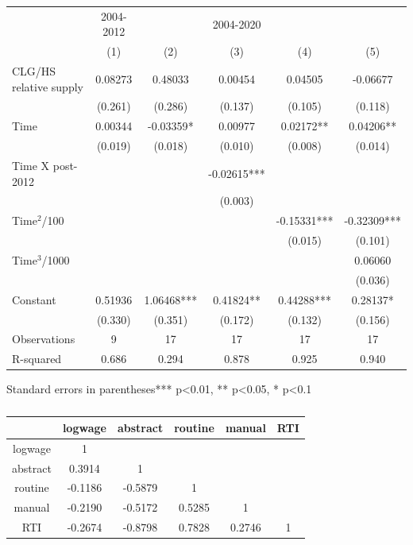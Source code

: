 \begin{center}
\begin{table}
\begin{centering}
\begin{tabular}{lccccc}
\toprule 
 & 2004-2012 &  & 2004-2020 &  & \tabularnewline
 & (1) & (2) & (3) & (4) & (5)\tabularnewline
\midrule
CLG/HS relative supply & 0.08273 & 0.48033 & 0.00454 & 0.04505 & -0.06677\tabularnewline
 & (0.261) & (0.286) & (0.137) & (0.105) & (0.118)\tabularnewline
Time & 0.00344 & -0.03359{*} & 0.00977 & 0.02172{*}{*} & 0.04206{*}{*}\tabularnewline
 & (0.019) & (0.018) & (0.010) & (0.008) & (0.014)\tabularnewline
Time X post-2012 &  &  & -0.02615{*}{*}{*} &  & \tabularnewline
 &  &  & (0.003) &  & \tabularnewline
Time$^{2}$/100 &  &  &  & -0.15331{*}{*}{*} & -0.32309{*}{*}{*}\tabularnewline
 &  &  &  & (0.015) & (0.101)\tabularnewline
Time$^{3}$/1000 &  &  &  &  & 0.06060\tabularnewline
 &  &  &  &  & (0.036)\tabularnewline
Constant & 0.51936 & 1.06468{*}{*}{*} & 0.41824{*}{*} & 0.44288{*}{*}{*} & 0.28137{*}\tabularnewline
 & (0.330) & (0.351) & (0.172) & (0.132) & (0.156)\tabularnewline
Observations & 9 & 17 & 17 & 17 & 17\tabularnewline
R-squared & 0.686 & 0.294 & 0.878 & 0.925 & 0.940\tabularnewline
\bottomrule
\end{tabular}
\par\end{centering}
Standard errors in parentheses{*}{*}{*} p<0.01, {*}{*} p<0.05, {*}
p<0.1
\end{table}
\begin{table}[H]
\caption{}

\centering{}%
\begin{tabular}{cccccc}
\toprule 
 & logwage & abstract & routine & manual & RTI\tabularnewline
\midrule
logwage & 1 &  &  &  & \tabularnewline
abstract & 0.3914 & 1 &  &  & \tabularnewline
routine & -0.1186 & -0.5879 & 1 &  & \tabularnewline
manual & -0.2190 & -0.5172 & 0.5285 & 1 & \tabularnewline
RTI & -0.2674 & -0.8798 & 0.7828 & 0.2746 & 1\tabularnewline
\bottomrule
\end{tabular}
\end{table}
\begin{table}
\caption{}


\end{table}
\end{center}

